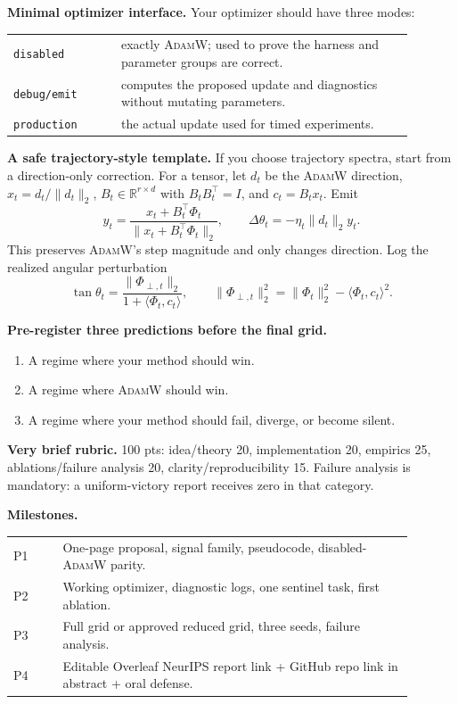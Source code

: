 \documentclass[10pt]{article}
\newcommand{\AdamW}{\textsc{AdamW}}
\newcommand{\R}{\mathbb{R}}
\begin{document}
\textbf{Minimal optimizer interface.} Your optimizer should have three modes:
\begin{center}
\begin{tabular}{@{}p{0.24\linewidth}p{0.65\linewidth}@{}}
\toprule
\texttt{disabled} & exactly \AdamW{}; used to prove the harness and parameter groups are correct. \\
\texttt{debug/emit} & computes the proposed update and diagnostics without mutating parameters. \\
\texttt{production} & the actual update used for timed experiments. \\
\bottomrule
\end{tabular}
\end{center}

\textbf{A safe trajectory-style template.} If you choose trajectory spectra, start from a direction-only correction. For a tensor, let $d_t$ be the \AdamW{} direction, $x_t=d_t/\|d_t\|_2$, $B_t\in\R^{r\times d}$ with $B_tB_t^\top=I$, and $c_t=B_tx_t$. Emit
\[
 y_t=\frac{x_t+B_t^\top\Phi_t}{\|x_t+B_t^\top\Phi_t\|_2},
 \qquad \Delta\theta_t=-\eta_t\|d_t\|_2 y_t .
\]
This preserves \AdamW{}'s step magnitude and only changes direction. Log the realized angular perturbation
\[
\tan\theta_t=\frac{\|\Phi_{\perp,t}\|_2}{1+\langle\Phi_t,c_t\rangle},\qquad
\|\Phi_{\perp,t}\|_2^2=\|\Phi_t\|_2^2-\langle\Phi_t,c_t\rangle^2.
\]

\textbf{Pre-register three predictions before the final grid.}
\begin{enumerate}
  \item A regime where your method should win.
  \item A regime where \AdamW{} should win.
  \item A regime where your method should fail, diverge, or become silent.
\end{enumerate}

\textbf{Very brief rubric.} 100 pts: idea/theory 20, implementation 20, empirics 25, ablations/failure analysis 20, clarity/reproducibility 15. Failure analysis is mandatory: a uniform-victory report receives zero in that category.

\textbf{Milestones.}
\begin{center}
\begin{tabular}{@{}p{0.11\linewidth}p{0.78\linewidth}@{}}
\toprule
P1 & One-page proposal, signal family, pseudocode, disabled-\AdamW{} parity. \\
P2 & Working optimizer, diagnostic logs, one sentinel task, first ablation. \\
P3 & Full grid or approved reduced grid, three seeds, failure analysis. \\
P4 & Editable Overleaf NeurIPS report link + GitHub repo link in abstract + oral defense. \\
\bottomrule
\end{tabular}
\end{center}
\end{document}
